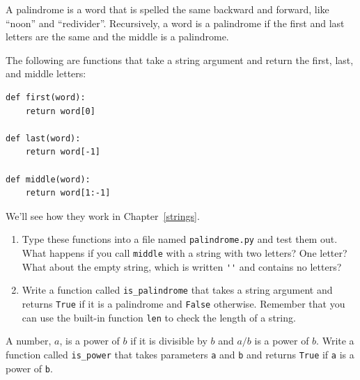 \documentclass[10pt]{book}
\begin{document}
\begin{ex}
\label{palindrome}


A palindrome is a word that is spelled the same backward and
forward, like ``noon'' and ``redivider''.  Recursively, a word
is a palindrome if the first and last letters are the same
and the middle is a palindrome.

The following are functions that take a string argument and
return the first, last, and middle letters:

\beforeverb
\begin{verbatim}
def first(word):
    return word[0]

def last(word):
    return word[-1]

def middle(word):
    return word[1:-1]
\end{verbatim}
\afterverb
%
We'll see how they work in Chapter~\ref{strings}.

\begin{enumerate}

\item Type these functions into a file named {\tt palindrome.py}
and test them out.  What happens if you call {\tt middle} with
a string with two letters?  One letter?  What about the empty
string, which is written \verb"''" and contains no letters?

\item Write a function called \verb"is_palindrome" that takes
a string argument and returns {\tt True} if it is a palindrome
and {\tt False} otherwise.  Remember that you can use the
built-in function {\tt len} to check the length of a string.

\end{enumerate}

\end{ex}

\begin{ex}
A number, $a$, is a power of $b$ if it is divisible by $b$
and $a/b$ is a power of $b$.  Write a function called
\verb"is_power" that takes parameters {\tt a} and {\tt b}
and returns {\tt True} if {\tt a} is a power of {\tt b}.
\end{ex}
\end{document}
